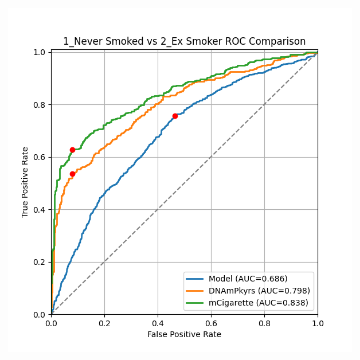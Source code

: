 \documentclass{article}
\begin{document}
\begin{figure}
\begin{subfigure}{0.48\textwidth}
    \end{subfigure}
    \par\vspace{0.5em}
    \begin{subfigure}{0.48\textwidth}
        \centering
        \includegraphics[width=\linewidth]{comparison_1v2_roc.png}
    \end{subfigure}
\end{figure}
\end{document}
